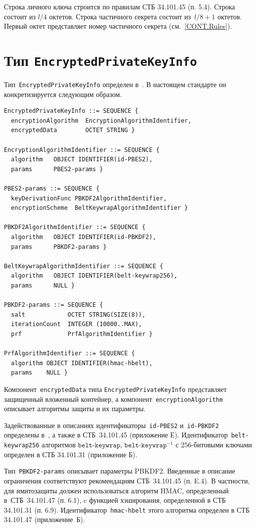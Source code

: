Строка личного ключа строится по правилам СТБ 34.101.45 (п. 5.4). 
Строка состоит из $l/4$ октетов. 
%
Строка частичного секрета состоит из~$l/8+1$ октетов. 
Первый октет представляет номер частичного секрета (см.~\ref{CONT.Rules}).

\section{Тип \texttt{EncryptedPrivateKeyInfo}}\label{CONT.CT}

Тип~\texttt{EncryptedPrivateKeyInfo} определен в~\cite{PKCS5}. В настоящем
стандарте он конкретизируется следующим образом.

\begin{verbatim}
EncryptedPrivateKeyInfo ::= SEQUENCE {
  encryptionAlgorithm  EncryptionAlgorithmIdentifier,
  encryptedData        OCTET STRING }

EncryptionAlgorithmIdentifier ::= SEQUENCE {
  algorithm   OBJECT IDENTIFIER(id-PBES2),
  params      PBES2-params }

PBES2-params ::= SEQUENCE {
  keyDerivationFunc PBKDF2AlgorithmIdentifier,
  encryptionScheme  BeltKeywrapAlgorithmIdentifier }

PBKDF2AlgorithmIdentifier ::= SEQUENCE {
  algorithm   OBJECT IDENTIFIER(id-PBKDF2),
  params      PBKDF2-params }

BeltKeywrapAlgorithmIdentifier ::= SEQUENCE {
  algorithm   OBJECT IDENTIFIER(belt-keywrap256),
  params      NULL }

PBKDF2-params ::= SEQUENCE {
  salt            OCTET STRING(SIZE(8)),
  iterationCount  INTEGER (10000..MAX),
  prf             PrfAlgorithmIdentifier }

PrfAlgorithmIdentifier ::= SEQUENCE {
  algorithm OBJECT IDENTIFIER(hmac-hbelt), 
  params    NULL }

\end{verbatim}

Компонент~\texttt{encryptedData} типа \texttt{EncryptedPrivateKeyInfo}
представляет защищенный вложенный контейнер, 
а компонент~\texttt{encryptionAlgorithm} описывает
алгоритмы защиты и их параметры. 

Задействованные в описаниях идентификаторы~\texttt{id-PBES2} 
и~\texttt{id-PBKDF2} определены в~\cite{PKCS5}, а также в СТБ~34.101.45 
(приложение Е).  
%
Идентификатор~\texttt{belt-keywrap256} алгоритмов 
$\texttt{belt-keywrap}$, $\texttt{belt-keywrap}^{-1}$
с $256$-битовыми ключами определен в СТБ 34.101.31 (приложение Б).

Тип~\texttt{PBKDF2-params} описывает параметры PBKDF2.
Введенные в описание ограничения соответствуют 
рекомендациям СТБ~34.101.45 (п. E.4).
%
В частности, для имитозащиты должен использоваться алгоритм HMAC, 
определенный в~СТБ~34.101.47 (п. 6.1), c функцией хэширования, 
определенной в СТБ 34.101.31 (п. 6.9). 
Идентификатор~\texttt{hmac-hbelt} этого алгоритма 
определен в СТБ 34.101.47 (приложение~Б).

